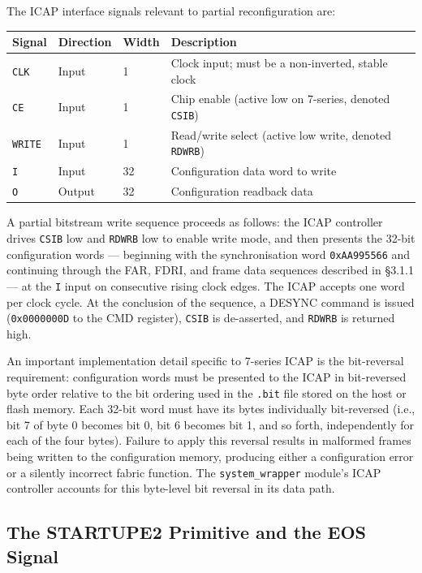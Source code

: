 The ICAP interface signals relevant to partial reconfiguration are:

\begin{table}[htbp]
\centering
\begin{tabularx}{\textwidth}{X X X X}
\toprule
Signal & Direction & Width & Description \\
\midrule
\texttt{CLK} & Input & 1 & Clock input; must be a non-inverted, stable clock \\
\texttt{CE} & Input & 1 & Chip enable (active low on 7-series, denoted \texttt{CSIB}) \\
\texttt{WRITE} & Input & 1 & Read/write select (active low write, denoted \texttt{RDWRB}) \\
\texttt{I} & Input & 32 & Configuration data word to write \\
\texttt{O} & Output & 32 & Configuration readback data \\
\bottomrule
\end{tabularx}
\end{table}

A partial bitstream write sequence proceeds as follows: the ICAP controller drives \texttt{CSIB} low and \texttt{RDWRB} low to enable write mode, and then presents the 32-bit configuration words — beginning with the synchronisation word \texttt{0xAA995566} and continuing through the FAR, FDRI, and frame data sequences described in §3.1.1 — at the \texttt{I} input on consecutive rising clock edges. The ICAP accepts one word per clock cycle. At the conclusion of the sequence, a DESYNC command is issued (\texttt{0x0000000D} to the CMD register), \texttt{CSIB} is de-asserted, and \texttt{RDWRB} is returned high.

An important implementation detail specific to 7-series ICAP is the bit-reversal requirement: configuration words must be presented to the ICAP in bit-reversed byte order relative to the bit ordering used in the \texttt{.bit} file stored on the host or flash memory. Each 32-bit word must have its bytes individually bit-reversed (i.e., bit 7 of byte 0 becomes bit 0, bit 6 becomes bit 1, and so forth, independently for each of the four bytes). Failure to apply this reversal results in malformed frames being written to the configuration memory, producing either a configuration error or a silently incorrect fabric function. The \texttt{system\_wrapper} module's ICAP controller accounts for this byte-level bit reversal in its data path.

\subsection{The STARTUPE2 Primitive and the EOS Signal}

